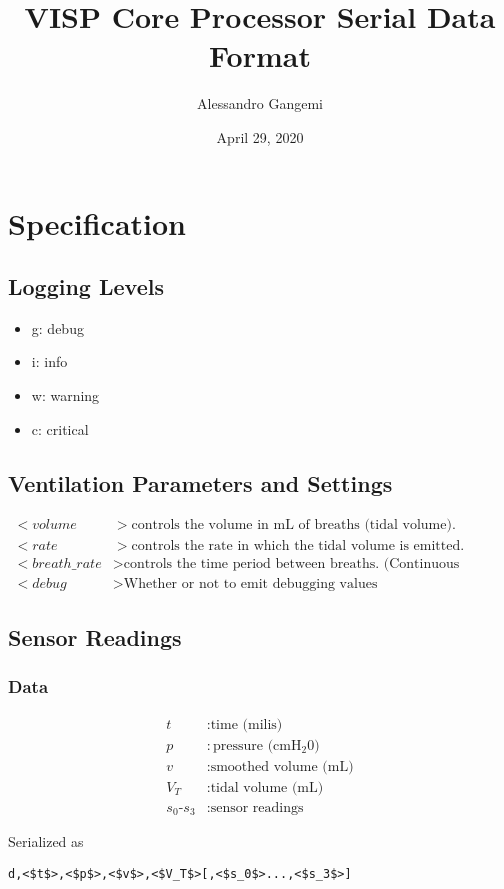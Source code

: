 \documentclass[10pt]{article}
\title{VISP Core Processor Serial Data Format}
\date{April 29, 2020}
\author{Alessandro Gangemi}
\begin{document}
\maketitle
\section{Specification}
\subsection{Logging Levels}
\renewcommand\labelitemi{}
\begin{itemize}
\item g: debug
\item i: info
\item w: warning
\item c: critical
\end{itemize}

\subsection{Ventilation Parameters and Settings}
\begin{align*}
	<volume&> \text{controls the volume in mL of breaths (tidal volume)}. \\
	<rate&> \text{controls the rate in which the tidal volume is emitted}. \\
	<breath\_rate&> \text{controls the time period between breaths. (Continuous Mandatory Ventilation)}\\
	<debug&> \text{Whether or not to emit debugging values}
\end{align*}

\subsection{Sensor Readings}
\subsubsection{Data}
\begin{align*}
	t&: \text{time (milis)}\\
	p&: \text{pressure (cmH\(_2\)0)}\\
	v&: \text{smoothed volume (mL)}\\
	V_T&: \text{tidal volume (mL)}\\
	s_0\text{-}s_3&: \text{sensor readings}
\end{align*}

Serialized as
\begin{lstlisting}[mathescape=true]
	d,<$t$>,<$p$>,<$v$>,<$V_T$>[,<$s_0$>...,<$s_3$>]
\end{lstlisting}
\end{document}
